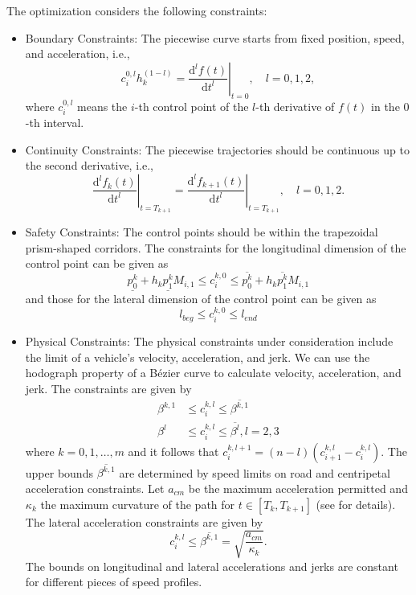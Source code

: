 \documentclass[journal,a4paper,onecolumn,12pt]{IEEEtran}
\begin{document}
The optimization considers the following constraints:
\begin{itemize}
    \item Boundary Constraints: The piecewise curve starts from fixed position, speed, and acceleration, i.e.,
    $$
    c_{i}^{0, l} h_{k}^{(1-l)}=\left.\frac{\mathrm{d}^{l} f(t)}{\mathrm{d} t^{l}}\right|_{t=0}, \quad l=0,1,2,
    $$
    where $c_{i}^{0,l}$ means the $i$-th control point of the $l$-th derivative of $f(t)$ in the $0$-th interval.
    \item Continuity Constraints: The piecewise trajectories should be continuous up to the second derivative, i.e.,
    $$
    \left.\frac{\mathrm{d}^{l} f_{k}(t)}{\mathrm{d} t^{l}}\right|_{t=T_{k+1}}=\left.\frac{\mathrm{d}^{l} f_{k+1}(t)}{\mathrm{d} t^{l}}\right|_{t=T_{k+1}}, \quad l=0,1,2.
    $$
    \item Safety Constraints: The control points should be within the trapezoidal prism-shaped corridors. The constraints for the longitudinal dimension of the control point can be given as
    $$
    \underline{p_{0}^{k}}+h_{k}\underline{p_{1}^{k}}M_{i,1} \leq c_{i}^{k, 0} \leq \overline{p_{0}^{k}}+h_{k}\overline{p_{1}^{k}}M_{i,1}
    $$
    and those for the lateral dimension of the control point can be given as
    $$
    l_{beg} \leq c_{i}^{k, 0} \leq l_{end}
    $$

    \item Physical Constraints: The physical constraints under consideration include the limit of a vehicle's velocity, acceleration, and jerk. We can use the hodograph property of a B\'{e}zier curve to calculate velocity, acceleration, and jerk. The constraints are given by
    $$
    \begin{aligned}
    \beta^{k, 1} & \leq c_{i}^{k, l} \leq \overline{\beta^{k, 1}} \\
    \beta^{l} & \leq c_{i}^{k, l} \leq \overline{\beta^{l}}, l=2,3
    \end{aligned}
    $$
    where $k=0,1, \ldots, m$ and it follows that $c_{i}^{k, l+1}=(n-l)\left(c_{i+1}^{k, l}-c_{i}^{k, l}\right)$. The upper bounds $\overline{\beta^{k, 1}}$ are determined by speed limits on road and centripetal acceleration constraints. Let $a_{c m}$ be the maximum acceleration permitted and $\kappa_{k}$ the maximum curvature of the path for $t \in\left[T_{k}, T_{k+1}\right]$ (see \cite{8916917} for details). The lateral acceleration constraints are given by
    $$
    c_{i}^{k, l} \leq \overline{\beta^{k, 1}}=\sqrt{\frac{a_{c m}}{\kappa_{k}}} .
    $$
The bounds on longitudinal and lateral accelerations and jerks are constant for different pieces of speed profiles.
\end{itemize}
\end{document}
